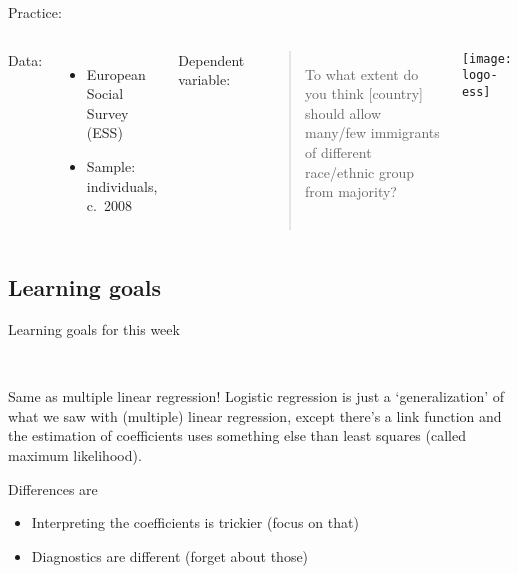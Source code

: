 \documentclass[t]{beamer}
\begin{document}
	\begin{frame}[t]{Practice: }

		\begin{columns}[c]

	    Data:\\[.5em]

			\begin{itemize}
				\item European Social Survey (ESS)
				\item Sample: individuals, c.~2008
			\end{itemize}
		
			\vspace{.75em}
		
	    Dependent variable:\\[.5em]
		
			\begin{quote}
			  To what extent do you think [country] should allow %
				many/few immigrants of different race/ethnic group %
				from majority?				
			\end{quote}
	

			\texttt{[image: logo-ess]}

		\end{columns}
	
	\end{frame}

   \subsection{Learning goals}

  \begin{frame}[t]{Learning goals for this week}

    \\[1em]

     \begin{alertblock}{Same as multiple linear regression!}
        Logistic regression is just a `generalization' of what we saw with (multiple) linear regression, except there's a link function and the estimation of coefficients uses something else than least squares (called maximum likelihood).%
     \end{alertblock}

     \begin{block}{Differences are}
        \begin{itemize}
          \item Interpreting the coefficients is trickier (focus on that)%
          \item Diagnostics are different (forget about those)%
      \end{itemize}
     \end{block}
   \end{frame}
\end{document}
